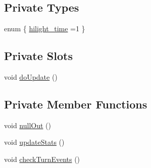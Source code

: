 \subsection*{Private Types}
\begin{DoxyCompactItemize}
\item 
enum \{ \hyperlink{classNetHackQtStatusWindow_aec59be9b40977af9e5fe6df34c9cb1fda67c56cc2a88e7730e32df56762e3557c}{hilight\+\_\+time} =1
 \}
\end{DoxyCompactItemize}
\subsection*{Private Slots}
\begin{DoxyCompactItemize}
\item 
void \hyperlink{classNetHackQtStatusWindow_aa7593d7e1fb340948ec31ae9e71a0b45}{do\+Update} ()
\end{DoxyCompactItemize}
\subsection*{Private Member Functions}
\begin{DoxyCompactItemize}
\item 
void \hyperlink{classNetHackQtStatusWindow_aa6752a41af715835ff5d3b4740bf3f05}{null\+Out} ()
\item 
void \hyperlink{classNetHackQtStatusWindow_af768c81bbc8d49e5c47018ce1923db0a}{update\+Stats} ()
\item 
void \hyperlink{classNetHackQtStatusWindow_af386c34ac4a1a64ece9e9fbc2caffdb4}{check\+Turn\+Events} ()
\end{DoxyCompactItemize}
